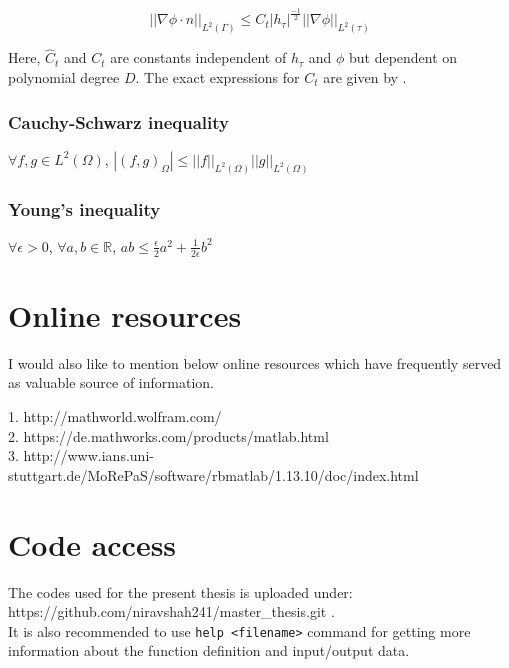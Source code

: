 \documentclass[a4paper,openany]{book}
\begin{document}
\begin{appendices}
\begin{equation}
||\nabla \phi \cdot n||_{L^2(\Gamma)} \leq {C}_t |h_\tau|^{\frac{-1}{2}} ||\nabla \phi||_{L^2(\tau)}
\end{equation}

Here, $\hat{C}_t$ and ${C}_t$ are constants independent of $h_\tau$ and $\phi$ but dependent on polynomial degree $D$. The exact expressions for $C_t$ are given by \cite{warburton}.

\subsubsection{Cauchy-Schwarz inequality} 
\begin{center}
$\forall f,g \in L^2(\Omega)$, $|(f,g)_{\Omega}| \leq ||f||_{L^2(\Omega)} ||g||_{L^2(\Omega)}$ \\
\end{center}

\subsubsection{Young's inequality} 
\begin{center}
$\forall \epsilon > 0$, $\forall a,b \in \mathbb{R}$, $ab \leq \frac{\epsilon}{2}a^2 + \frac{1}{2 \epsilon}b^2$\\
\end{center}

\end{appendices}

\begin{appendices}

\newpage

\section{Online resources}

I would also like to mention below online resources which have frequently served as valuable source of information.\\

\begin{flushleft}
1. http://mathworld.wolfram.com/\\
2. https://de.mathworks.com/products/matlab.html\\
3. http://www.ians.uni-stuttgart.de/MoRePaS/software/rbmatlab/1.13.10/doc/index.html \\
\end{flushleft}

\section{Code access}

The codes used for the present thesis is uploaded under: \\
https://github.com/niravshah241/master\_thesis.git .\\


It is also recommended to use \verb|help <filename>| command for getting more information about the function definition and input/output data.

\end{appendices}




\end{document}
